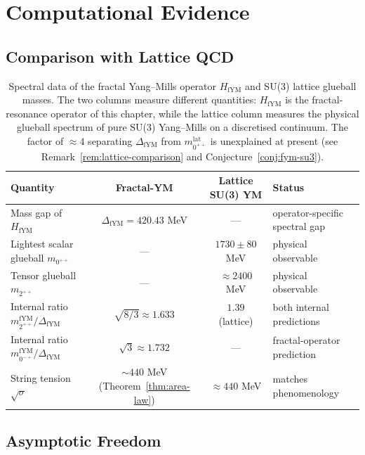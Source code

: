 \section{Computational Evidence}

\subsection{Comparison with Lattice QCD}

\begin{table}[h]
\centering
\begin{tabular}{lccl}
\toprule
\textbf{Quantity} & \textbf{Fractal-YM} & \textbf{Lattice SU(3) YM} & \textbf{Status} \\
\midrule
Mass gap of $H_{\mathrm{fYM}}$ & $\Delta_{\mathrm{fYM}} = 420.43$ MeV & --- & operator-specific spectral gap \\
Lightest scalar glueball $m_{0^{++}}$ & --- & $1730 \pm 80$ MeV & physical observable\cite{morningstar1999glueball} \\
Tensor glueball $m_{2^{++}}$ & --- & $\approx 2400$ MeV & physical observable\cite{morningstar1999glueball} \\
Internal ratio $m^{\mathrm{fYM}}_{2^{++}}/\Delta_{\mathrm{fYM}}$ & $\sqrt{8/3} \approx 1.633$ & $1.39$ (lattice) & both internal predictions \\
Internal ratio $m^{\mathrm{fYM}}_{0^{-+}}/\Delta_{\mathrm{fYM}}$ & $\sqrt{3} \approx 1.732$ & --- & fractal-operator prediction \\
String tension $\sqrt{\sigma}$ & $\sim 440$ MeV (Theorem~\ref{thm:area-law}) & $\approx 440$ MeV & matches phenomenology \\
\bottomrule
\end{tabular}
\caption{Spectral data of the fractal Yang--Mills operator $H_{\mathrm{fYM}}$ and SU(3) lattice glueball masses. The two columns measure different quantities: $H_{\mathrm{fYM}}$ is the fractal-resonance operator of this chapter, while the lattice column measures the physical glueball spectrum of pure SU(3) Yang--Mills on a discretised continuum. The factor of $\approx 4$ separating $\Delta_{\mathrm{fYM}}$ from $m_{0^{++}}^{\mathrm{lat}}$ is unexplained at present (see Remark~\ref{rem:lattice-comparison} and Conjecture~\ref{conj:fym-su3}).\cite{morningstar1999glueball,chen2006glueball,greensite2011confinement}}
\end{table}

\subsection{Asymptotic Freedom}

